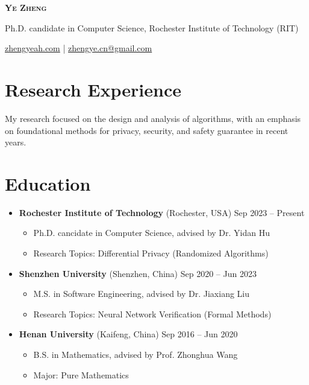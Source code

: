 \documentclass[a4paper,11pt]{article}
\newcommand{\topicon}[1]{\raisebox{0.01em}{\resizebox{!}{0.7em}{#1}}}
\newcommand{\headerfontiii}{\fontfamily{ppl}\selectfont} %
\begin{document}
\headerfontiii

\begin{center}
    {\Huge\textbf{\scshape Ye Zheng}}
\end{center}
\vspace{-3mm}

\begin{center}
  \small{Ph.D. candidate in Computer Science, Rochester Institute of Technology (RIT)}
\end{center}
\vspace{-6mm}
\begin{center}
    \small{\topicon{\faGlobe} \href{https://zhengyeah.com}{zhengyeah.com} | 
    \topicon{\faMailBulk} \href{mailto:zhengye.cn@gmail.com}{zhengye.cn@gmail.com}}
\end{center}

\section{\textbf{Research Experience}}

My research focused on the design and analysis of algorithms, with an emphasis on 
foundational methods for privacy, security, and safety guarantee in recent years.

\section{\textbf{Education}}

\begin{itemize}[leftmargin=0pt,label={}]
    \item \textbf{Rochester Institute of Technology}{ \scriptsize (Rochester, USA)} \hfill Sep 2023 -- Present\vspace{-0.5em}    
    \begin{itemize}
      \item Ph.D. cancidate in Computer Science, advised by Dr. Yidan Hu
      \item Research Topics: Differential Privacy (Randomized Algorithms)
    \end{itemize}
    \item \textbf{Shenzhen University}{ \scriptsize (Shenzhen, China)} \hfill Sep 2020 -- Jun 2023\vspace{-0.5em}
    \begin{itemize}
      \item M.S. in Software Engineering, advised by Dr. Jiaxiang Liu
      \item Research Topics: Neural Network Verification (Formal Methods)
    \end{itemize}
    \item \textbf{Henan University}{ \scriptsize (Kaifeng, China)} \hfill Sep 2016 -- Jun 2020\vspace{-0.5em}
    \begin{itemize}
      \item B.S. in Mathematics, advised by Prof. Zhonghua Wang
      \item Major: Pure Mathematics
    \end{itemize}
\end{itemize}
\end{document}
